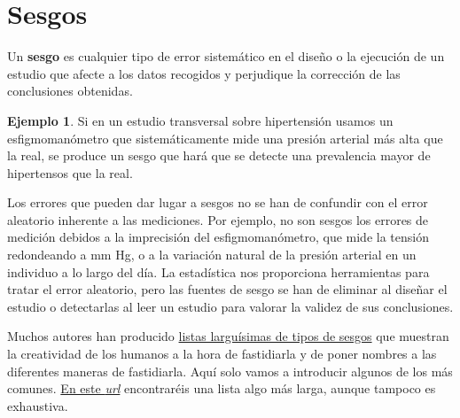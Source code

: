 \documentclass[
]{book}
\theoremstyle{definition}
\theoremstyle{definition}
\newtheorem{example}{Ejemplo}[chapter]
\theoremstyle{definition}
\theoremstyle{definition}
\theoremstyle{remark}
\begin{document}
\hypertarget{sec:sesgos}{%
\section{Sesgos}\label{sec:sesgos}}

Un \textbf{sesgo} es cualquier tipo de error sistemático en el diseño o la ejecución de un estudio que afecte a los datos recogidos y perjudique la corrección de las conclusiones obtenidas.

\begin{example}
\protect\hypertarget{exm:unnamed-chunk-79}{}\label{exm:unnamed-chunk-79}Si en un estudio transversal sobre hipertensión usamos un esfigmomanómetro que sistemáticamente mide una presión arterial más alta que la real, se produce un sesgo que hará que se detecte una prevalencia mayor de hipertensos que la real.
\end{example}

Los errores que pueden dar lugar a sesgos no se han de confundir con el error aleatorio inherente a las mediciones. Por ejemplo, no son sesgos los errores de medición debidos a la imprecisión del esfigmomanómetro, que mide la tensión redondeando a mm Hg, o a la variación natural de la presión arterial en un individuo a lo largo del día. La estadística nos proporciona herramientas para tratar el error aleatorio, pero las fuentes de sesgo se han de eliminar al diseñar el estudio o detectarlas al leer un estudio para valorar la validez de sus conclusiones.

Muchos autores han producido \href{https://catalogofbias.org/biases/}{listas larguísimas de tipos de sesgos} que muestran la creatividad de los humanos a la hora de fastidiarla y de poner nombres a las diferentes maneras de fastidiarla. Aquí solo vamos a introducir algunos de los más comunes. \href{https://www.scientific-european-federation-osteopaths.org/los-sesgos/}{En este \emph{url}} encontraréis una lista algo más larga, aunque tampoco es exhaustiva.
\end{document}
